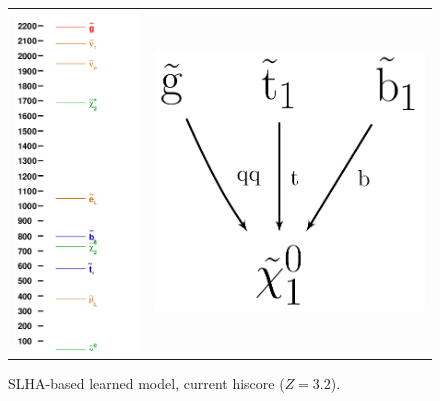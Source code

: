 \documentclass[11pt,singleside,a4paper,makeidx,notitlepage]{article}
\begin{document}
\begin{figure}[h!t]
\begin{center}
\begin{tabular}{cc}
\includegraphics[width=.49\textwidth]{ruler.png} &
\includegraphics[width=.49\textwidth]{decays.png}
\end{tabular}
\caption{SLHA-based learned model, current hiscore ($Z=3.2$).}
\label{fig:hiscore}
\end{center}
\end{figure}

%
% 
\end{document}
